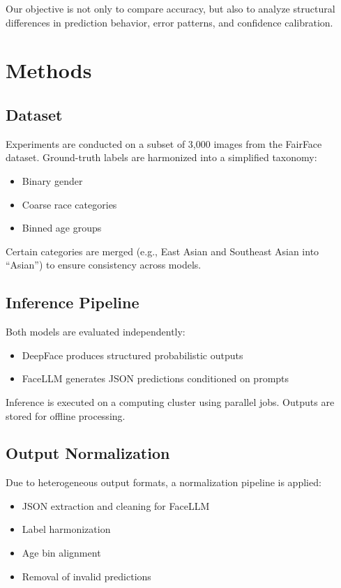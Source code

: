 \documentclass[a4paper,11pt,twocolumn]{article}
\begin{document}
Our objective is not only to compare accuracy, but also to analyze structural differences in prediction behavior, error patterns, and confidence calibration.

\section{Methods}

\subsection{Dataset}

Experiments are conducted on a subset of 3,000 images from the FairFace dataset. Ground-truth labels are harmonized into a simplified taxonomy:

\begin{itemize}
    \item Binary gender
    \item Coarse race categories
    \item Binned age groups
\end{itemize}

Certain categories are merged (e.g., East Asian and Southeast Asian into ``Asian'') to ensure consistency across models.

\subsection{Inference Pipeline}

Both models are evaluated independently:

\begin{itemize}
    \item DeepFace produces structured probabilistic outputs
    \item FaceLLM generates JSON predictions conditioned on prompts
\end{itemize}

Inference is executed on a computing cluster using parallel jobs. Outputs are stored for offline processing.

\subsection{Output Normalization}

Due to heterogeneous output formats, a normalization pipeline is applied:

\begin{itemize}
    \item JSON extraction and cleaning for FaceLLM
    \item Label harmonization
    \item Age bin alignment
    \item Removal of invalid predictions
\end{itemize}
\end{document}

